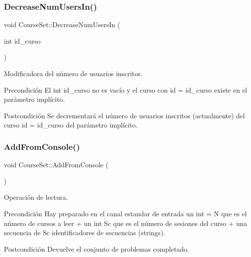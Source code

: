 \subsubsection{\texorpdfstring{Decrease\+Num\+Users\+In()}{DecreaseNumUsersIn()}}
{\footnotesize\ttfamily void Course\+Set\+::\+Decrease\+Num\+Users\+In (\begin{DoxyParamCaption}\item[{int}]{id\+\_\+curso }\end{DoxyParamCaption})}



Modificadora del número de usuarios inscritos. 

\begin{DoxyPrecond}{Precondición}
El int id\+\_\+curso no es vacío y el curso con id = id\+\_\+curso existe en el parámetro implícito. 
\end{DoxyPrecond}
\begin{DoxyPostcond}{Postcondición}
Se decrementará el número de usuarios inscritos (actualmente) del curso id = id\+\_\+curso del parámetro implícito. 
\end{DoxyPostcond}
\mbox{\label{class_course_set_aee9d2b96c43a828049e02205736a4982}} 
\subsubsection{\texorpdfstring{Add\+From\+Console()}{AddFromConsole()}}
{\footnotesize\ttfamily void Course\+Set\+::\+Add\+From\+Console (\begin{DoxyParamCaption}{ }\end{DoxyParamCaption})}



Operación de lectura. 

\begin{DoxyPrecond}{Precondición}
Hay preparado en el canal estandar de entrada un int = N que es el número de cursos a leer + un int Sc que es el número de sesiones del curso + una secuencia de Sc identificadores de secuencias (strings). 
\end{DoxyPrecond}
\begin{DoxyPostcond}{Postcondición}
Devuelve el conjunto de problemas completado. 
\end{DoxyPostcond}
\mbox{\label{class_course_set_a31726d4dcdefc4a218f9e1466fd2ef38}} 
